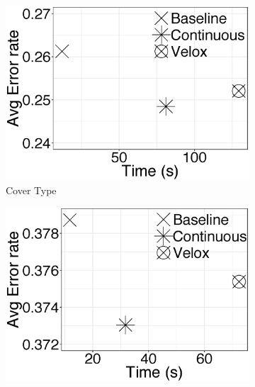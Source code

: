 \documentclass{vldb}
\begin{document}
\begin{figure}[h]
\begin{subfigure}{0.33\textwidth}
  \centering
  \includegraphics[width=1\linewidth, height=1\linewidth, keepaspectratio]{../images/experiment-results/cover-type-meta-performance.eps}
  \caption{Cover Type}
  \label{fig:sfig2}
\end{subfigure}%
\begin{subfigure}{0.33\textwidth}
 \centering
  \includegraphics[width=1\linewidth, height=1\linewidth, keepaspectratio]{../images/experiment-results/higgs-sample-meta-performance.eps}

\end{subfigure}
\end{figure}
\end{document}
